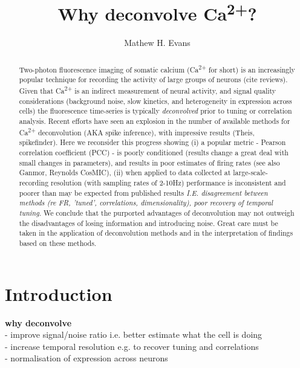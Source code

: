 \documentclass[a4paper]{article}
\title{Why deconvolve Ca\textsuperscript{2+}?}
\author{Mathew H. Evans}
\begin{document}
\maketitle

\begin{abstract}
Two-photon fluorescence imaging of somatic calcium (Ca\textsuperscript{2+} for short) is an increasingly popular technique for recording the activity of large groups of neurons (cite reviews). Given that Ca\textsuperscript{2+} is an indirect measurement of neural activity, and signal quality considerations (background noise, slow kinetics, and heterogeneity in expression across cells) the fluorescence time-series is typically \emph{deconvolved} prior to tuning or correlation analysis. Recent efforts have seen an explosion in the number of available methods for Ca\textsuperscript{2+} deconvolution (AKA spike inference), with impressive results (Theis, spikefinder). Here we reconsider this progress showing (i) a popular metric - Pearson correlation coefficient (PCC) - is poorly conditioned (results change a great deal with small changes in parameters), and results in poor estimates of firing rates (see also Ganmor, Reynolds CosMIC), (ii) when applied to data collected at large-scale-recording resolution (with sampling rates of 2-10Hz) performance is inconsistent and poorer than may be expected from published results \emph{I.E. disagreement between methods (re FR, 'tuned', correlations, dimensionality), poor recovery of temporal tuning}. We conclude that the purported advantages of deconvolution may not outweigh the disadvantages of losing information and introducing noise. Great care must be taken in the application of deconvolution methods and in the interpretation of findings based on these methods.

\end{abstract}

\section{Introduction}
\textbf{why deconvolve} \\
- improve signal/noise ratio i.e. better estimate what the cell is doing\\
- increase temporal resolution e.g. to recover tuning and correlations\\
- normalisation of expression across neurons\\
\end{document}
